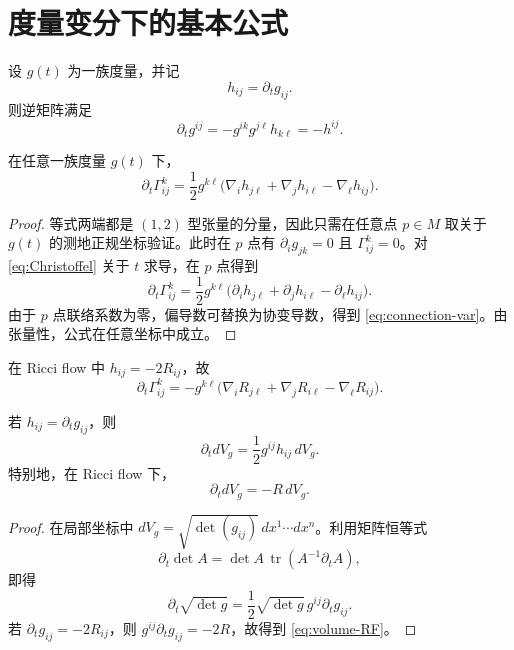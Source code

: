 \documentclass[11pt,a4paper,cn,nofont,math=cm,mode=fancy,bibtex]{elegantbook}
\numberwithin{equation}{chapter}
\numberwithin{figure}{chapter}
\newcommand{\tr}{\operatorname{tr}}
\begin{document}
\section{度量变分下的基本公式}

设 $g(t)$ 为一族度量，并记
\[
  h_{ij}=\partial_t g_{ij}.
\]
则逆矩阵满足
\begin{equation}\label{eq:inverse-var}
  \partial_t g^{ij}=-g^{ik}g^{j\ell}h_{k\ell}=-h^{ij}.
\end{equation}

\begin{lem}[联络变分公式]\label{lem:connection-var}
在任意一族度量 $g(t)$ 下，
\begin{equation}\label{eq:connection-var}
  \partial_t\Gamma^k_{ij}
  =\frac12 g^{k\ell}\bigl(\nabla_i h_{j\ell}+\nabla_j h_{i\ell}-\nabla_\ell h_{ij}\bigr).
\end{equation}
\end{lem}

\begin{proof}
等式两端都是 $(1,2)$ 型张量的分量，因此只需在任意点 $p\in M$ 取关于 $g(t)$ 的测地正规坐标验证。此时在 $p$ 点有 $\partial_i g_{jk}=0$ 且 $\Gamma^k_{ij}=0$。对 \eqref{eq:Christoffel} 关于 $t$ 求导，在 $p$ 点得到
\[
  \partial_t\Gamma^k_{ij}
  =\frac12 g^{k\ell}\bigl(\partial_i h_{j\ell}+\partial_j h_{i\ell}-\partial_\ell h_{ij}\bigr).
\]
由于 $p$ 点联络系数为零，偏导数可替换为协变导数，得到 \eqref{eq:connection-var}。由张量性，公式在任意坐标中成立。
\end{proof}

在 Ricci flow 中 $h_{ij}=-2R_{ij}$，故
\begin{equation}\label{eq:Gamma-RF}
  \partial_t\Gamma^k_{ij}
  =-g^{k\ell}\bigl(\nabla_iR_{j\ell}+\nabla_jR_{i\ell}-\nabla_\ell R_{ij}\bigr).
\end{equation}

\begin{lem}[体积元变分]\label{lem:volume-var}
若 $h_{ij}=\partial_t g_{ij}$，则
\begin{equation}\label{eq:volume-var}
  \partial_t dV_g=\frac12 g^{ij}h_{ij}\,dV_g.
\end{equation}
特别地，在 Ricci flow 下，
\begin{equation}\label{eq:volume-RF}
  \partial_t dV_g=-R\,dV_g.
\end{equation}
\end{lem}

\begin{proof}
在局部坐标中 $dV_g=\sqrt{\det(g_{ij})}\,dx^1\cdots dx^n$。利用矩阵恒等式
\[
  \partial_t\det A=\det A\,\tr(A^{-1}\partial_t A),
\]
即得
\[
  \partial_t\sqrt{\det g}
  =\frac12\sqrt{\det g}\,g^{ij}\partial_tg_{ij}.
\]
若 $\partial_t g_{ij}=-2R_{ij}$，则 $g^{ij}\partial_tg_{ij}=-2R$，故得到 \eqref{eq:volume-RF}。
\end{proof}
\end{document}
